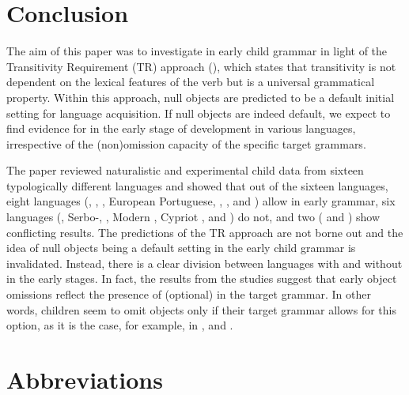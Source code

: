 \documentclass[output=paper,modfonts,newtxmath,hidelinks,]{langscibook}
\begin{document}
\section{Conclusion}\label{17:sec:key:4}

The aim of this paper was to investigate  in early child grammar in light of the Transitivity Requirement (TR) approach (\citealt{Cummins-Roberge2005}), which states that transitivity is not dependent on the lexical features of the verb but is a universal grammatical property. Within this approach, null objects are predicted to be a default initial setting for language acquisition. If null objects are indeed default, we expect to find evidence for  in the early stage of development in various languages, irrespective of the (non)omission capacity of the specific target grammars.

The paper reviewed naturalistic and experimental child data from sixteen typologically different languages and showed that out of the sixteen languages, eight languages (, , , European Portuguese, , ,  and ) allow  in early grammar, six languages (, Serbo-, , Modern , Cypriot , and ) do not, and two ( and ) show conflicting results. The predictions of the TR approach are not borne out and the idea of null objects being a default setting in the early child grammar is invalidated. Instead, there is a clear division between languages with and without  in the early stages. In fact, the results from the studies suggest that early object omissions reflect the presence of (optional)  in the target grammar. In other words, children seem to omit objects only if their target grammar allows for this option, as it is the case, for example, in ,  and .





\section*{Abbreviations}
\end{document}
